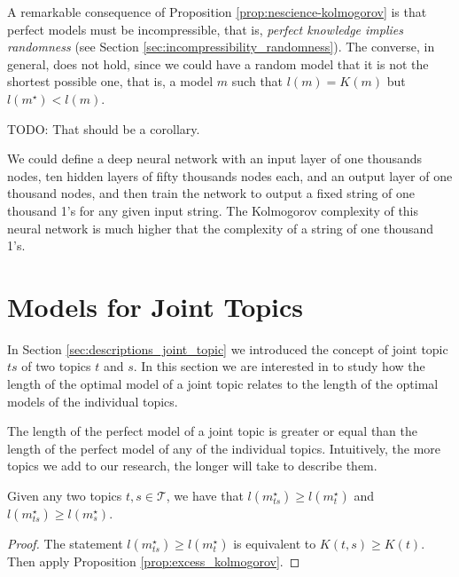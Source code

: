 A remarkable consequence of Proposition \ref{prop:nescience-kolmogorov} is that perfect models must be incompressible, that is, \emph{perfect knowledge implies randomness} (see Section \ref{sec:incompressibility_randomness}). The converse, in general, does not hold, since we could have a random model that it is not the shortest possible one, that is, a model $m$ such that $l(m) = K(m)$ but $l(m^{\star}) < l(m)$.

{\color{red} TODO: That should be a corollary.}

\begin{example}
\label{ex:description_neural}
We could define a deep neural network with an input layer of one thousands nodes, ten hidden layers of fifty thousands nodes each, and an output layer of one thousand nodes, and then train the network to output a fixed string of one thousand 1's for any given input string. The Kolmogorov complexity of this neural network is much higher that the complexity of a string of one thousand 1's.
\end{example}

%
%

\section{Models for Joint Topics}
\label{sec:descriptions_joint_model}

In Section \ref{sec:descriptions_joint_topic} we introduced the concept of joint topic $ts$ of two topics $t$ and $s$. In this section we are interested in to study how the length of the optimal model of a joint topic relates to the length of the optimal models of the individual topics.

The length of the perfect model of a joint topic is greater or equal than the length of the perfect model of any of the individual topics. Intuitively, the more topics we add to our research, the longer will take to describe them.

\begin{proposition}
\label{prop:joint_length}
Given any two topics $t,s \in \mathcal{T}$, we have that $l \left( m_{ts}^{\star} \right) \geq l \left( m_{t}^{\star} \right)$ and $l \left( m_{ts}^{\star} \right) \geq l \left( m_{s}^{\star} \right)$.
\end{proposition}
\begin{proof}
The statement $l \left( m_{ts}^{\star} \right) \geq l \left( m_{t}^{\star} \right)$ is equivalent to $K(t,s) \geq K(t)$. Then apply Proposition \ref{prop:excess_kolmogorov}.
\end{proof}


